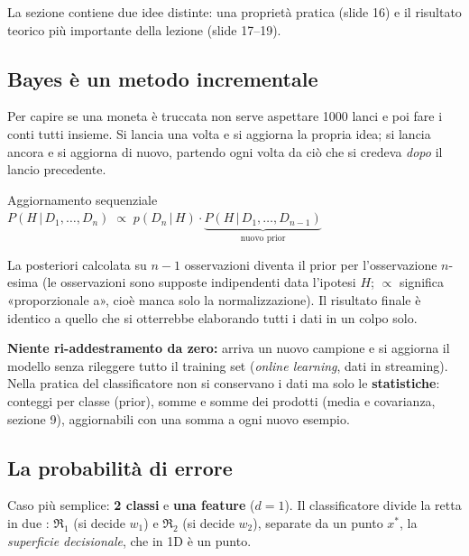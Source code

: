
La sezione contiene due idee distinte: una proprietà pratica (slide 16) e il risultato teorico più importante della lezione (slide 17–19).

\subsection{Bayes è un metodo incrementale}
\begin{intuizione}
Per capire se una moneta è truccata non serve aspettare 1000 lanci e poi fare i conti tutti insieme. Si lancia una volta e si aggiorna la propria idea; si lancia ancora e si aggiorna di nuovo, partendo ogni volta da ciò che si credeva \emph{dopo} il lancio precedente.
\end{intuizione}
\begin{formulat}{Aggiornamento sequenziale}
$\displaystyle P(H\,|\,D_1,\dots,D_n)\;\propto\; p(D_n\,|\,H)\cdot\underbrace{P(H\,|\,D_1,\dots,D_{n-1})}_{\text{nuovo prior}}$
\end{formulat}
La posteriori calcolata su $n-1$ osservazioni diventa il prior per l'osservazione $n$-esima (le osservazioni sono supposte indipendenti data l'ipotesi $H$; $\propto$ significa «proporzionale a», cioè manca solo la normalizzazione). Il risultato finale è identico a quello che si otterrebbe elaborando tutti i dati in un colpo solo.


\begin{mlbox}
\textbf{Niente ri-addestramento da zero:} arriva un nuovo campione e si aggiorna il modello senza rileggere tutto il training set (\emph{online learning}, dati in streaming). Nella pratica del classificatore non si conservano i dati ma solo le \textbf{statistiche}: conteggi per classe (prior), somme e somme dei prodotti (media e covarianza, sezione 9), aggiornabili con una somma a ogni nuovo esempio.
\end{mlbox}

\subsection{La probabilità di errore}
Caso più semplice: \textbf{2 classi} e \textbf{una feature} ($d=1$). Il classificatore divide la retta in due : $\Re_1$ (si decide $w_1$) e $\Re_2$ (si decide $w_2$), separate da un punto $x^*$, la \emph{superficie decisionale}, che in 1D è un punto.

